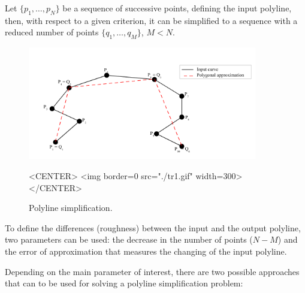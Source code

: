 Let $\{p_1, \ldots, p_N\}$ be a sequence of successive points, defining the
input polyline, then, with respect to a given criterion, it can be
simplified to a sequence with a reduced number of points $\{q_1,\ldots, q_M\}$, $M<N$.

\begin{figure}[h]
\begin{ccTexOnly}
\begin{center}
\includegraphics[width=10cm]{Polygonal_approximation_d/fig1} 
\end{center}
\end{ccTexOnly}
\caption{Polyline simplification.
\label{Simplification_Fig_intor}}
\begin{ccHtmlOnly}
<CENTER>
<img border=0 src="./tr1.gif" width=300>
</CENTER>
\end{ccHtmlOnly}
\end{figure} 

To define the differences (roughness) between the input and the output
polyline, two parameters can be used: the
decrease in the number of points  ($N-M$)
and the error of approximation that measures the changing of the input
polyline.  

Depending on the main parameter of interest, there are two possible
approaches that can to be used for solving a polyline simplification
problem: 

